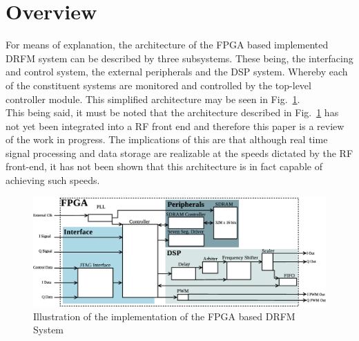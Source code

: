 \section{Overview} \label{sec:design}
	\noindent For means of explanation, the architecture of the FPGA based implemented DRFM system can be described by three subsystems. These being, the interfacing and control system, the external peripherals and the DSP system. Whereby each of the constituent systems are monitored and controlled by the top-level controller module. This simplified architecture may be seen in Fig.~\ref{fig:DRFM_Architecture}.\\ \newline This being said, it must be noted that the architecture described in Fig.~\ref{fig:DRFM_Architecture} has not yet been integrated into a RF front end and therefore this paper is a review of the work in progress. The implications of this are that although real time signal processing and data storage are realizable at the speeds dictated by the RF front-end, it has not been shown that this architecture is in fact capable of achieving such speeds.
	\begin{figure}[h!]
		\centering
		\includegraphics[width=0.95\linewidth]{img/System_Overview}
		\caption{Illustration of the implementation of the  FPGA based DRFM System}
		\label{fig:DRFM_Architecture}
	\end{figure}
	
